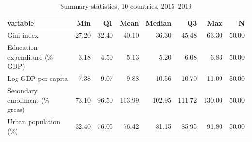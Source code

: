 \begin{table}[ht]
\centering
\begin{tabular}{lrrrrrrr}
  \hline
variable & Min & Q1 & Mean & Median & Q3 & Max & N \\ 
  \hline
Gini index & 27.20 & 32.40 & 40.10 & 36.30 & 45.48 & 63.30 & 50.00 \\ 
  Education expenditure (\% GDP) & 3.18 & 4.50 & 5.13 & 5.20 & 6.08 & 6.83 & 50.00 \\ 
  Log GDP per capita & 7.38 & 9.07 & 9.88 & 10.56 & 10.70 & 11.09 & 50.00 \\ 
  Secondary enrollment (\% gross) & 73.10 & 96.50 & 103.99 & 102.95 & 111.72 & 130.00 & 50.00 \\ 
  Urban population (\%) & 32.40 & 76.05 & 76.42 & 81.15 & 85.95 & 91.80 & 50.00 \\ 
   \hline
\end{tabular}
\caption{Summary statistics, 10 countries, 2015--2019} 
\label{tab:summary_stats}
\end{table}
